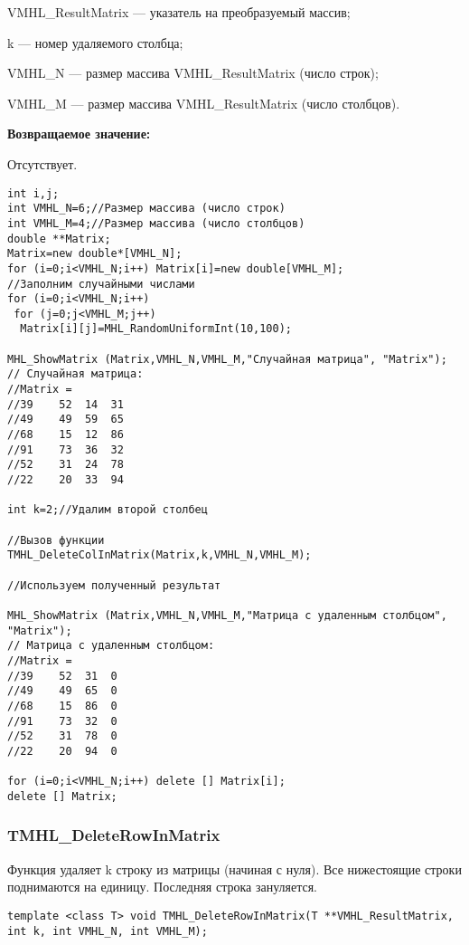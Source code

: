 \documentclass[a4paper,12pt]{article}
\begin{document}
VMHL\_ResultMatrix --- указатель на преобразуемый массив;
 
k --- номер удаляемого столбца;
 
VMHL\_N --- размер массива VMHL\_ResultMatrix (число строк);
 
VMHL\_M --- размер массива VMHL\_ResultMatrix (число столбцов).

\textbf{Возвращаемое значение:}

Отсутствует.


\begin{lstlisting}[label=code_use_TMHL_DeleteColInMatrix,caption=Пример использования]
int i,j;
int VMHL_N=6;//Размер массива (число строк)
int VMHL_M=4;//Размер массива (число столбцов)
double **Matrix;
Matrix=new double*[VMHL_N];
for (i=0;i<VMHL_N;i++) Matrix[i]=new double[VMHL_M];
//Заполним случайными числами
for (i=0;i<VMHL_N;i++)
 for (j=0;j<VMHL_M;j++)
  Matrix[i][j]=MHL_RandomUniformInt(10,100);

MHL_ShowMatrix (Matrix,VMHL_N,VMHL_M,"Случайная матрица", "Matrix");
// Случайная матрица:
//Matrix =
//39	52	14	31
//49	49	59	65
//68	15	12	86
//91	73	36	32
//52	31	24	78
//22	20	33	94

int k=2;//Удалим второй столбец

//Вызов функции
TMHL_DeleteColInMatrix(Matrix,k,VMHL_N,VMHL_M);

//Используем полученный результат

MHL_ShowMatrix (Matrix,VMHL_N,VMHL_M,"Матрица с удаленным столбцом", "Matrix");
// Матрица с удаленным столбцом:
//Matrix =
//39	52	31	0
//49	49	65	0
//68	15	86	0
//91	73	32	0
//52	31	78	0
//22	20	94	0

for (i=0;i<VMHL_N;i++) delete [] Matrix[i];
delete [] Matrix;
\end{lstlisting}

\subsubsection{TMHL\_DeleteRowInMatrix}\label{TMHL_DeleteRowInMatrix}

Функция удаляет k строку из матрицы (начиная с нуля). Все нижестоящие строки поднимаются на единицу. Последняя строка зануляется.


\begin{lstlisting}[label=code_syntax_TMHL_DeleteRowInMatrix,caption=Синтаксис]
template <class T> void TMHL_DeleteRowInMatrix(T **VMHL_ResultMatrix, int k, int VMHL_N, int VMHL_M);
\end{lstlisting}
\end{document}

